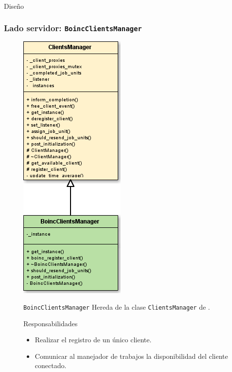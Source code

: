 \begin{subsection}{Diseño}
	\begin{frame}\frametitle{Lado servidor: \texttt{BoincClientsManager}}
  		\begin{figure}[h]
    		\begin{minipage}{3.3cm}
      			\includegraphics[scale=0.35]{images/BoincClientsManager.png}
    		\end{minipage}
    		\begin{minipage}{0.67 \textwidth}
				\begin{block}{\texttt{BoincClientsManager}}
      				Hereda de la clase \texttt{ClientsManager} de \fud .
      			\end{block}
      			\vspace{7mm}
      			\begin{block}{Responsabilidades}
      				\begin{itemize}
						\item Realizar el registro de un único cliente.
						\item Comunicar al manejador de trabajos la disponibilidad del cliente conectado.
					\end{itemize}
      			\end{block}	
      		\end{minipage}
    	\end{figure}
	\end{frame}
	

\end{subsection}
